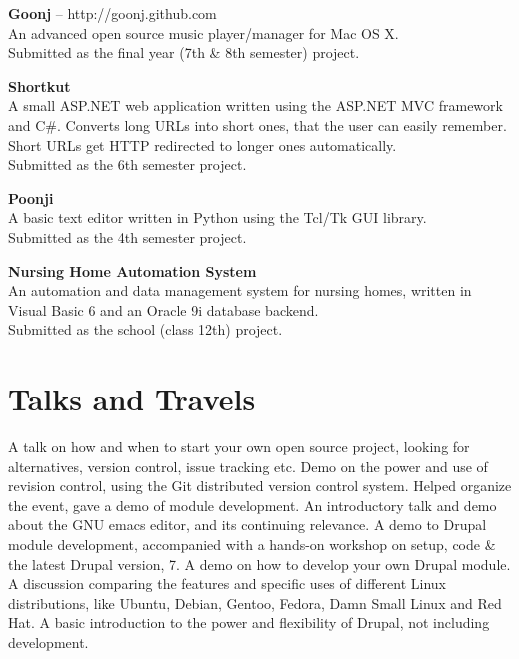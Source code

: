 \documentclass[11pt,a4paper]{moderncv}
\begin{document}
\cvlistitem
{\textbf{Goonj} -- {\small http://goonj.github.com}
  \\An advanced open source music player/manager for Mac OS X.
  \\Submitted as the final year (7th \& 8th semester) project.\\
}

\cvlistitem
{\textbf{Shortkut}
  \\A small ASP.NET web application written using the ASP.NET MVC framework and C\#. Converts long URLs into short ones, that the user can easily remember. Short URLs get HTTP redirected to longer ones automatically.
  \\Submitted as the 6th semester project.\\
}

\cvlistitem
{\textbf{Poonji}
  \\A basic text editor written in Python using the Tcl/Tk GUI library.
  \\Submitted as the 4th semester project.\\
}

\cvlistitem
{\textbf{Nursing Home Automation System}
  \\An automation and data management system for nursing homes, written in Visual Basic 6 and an Oracle 9i database backend.
  \\Submitted as the school (class 12th) project.\\
}

\pagebreak

\section{Talks and Travels}

{A talk on how and when to start your own open source project, looking for alternatives, version control, issue tracking etc.}
{Demo on the power and use of revision control, using the Git distributed version control system.}
{Helped organize the event, gave a demo of module development.}
{An introductory talk and demo about the GNU emacs editor, and its continuing relevance.}
{A demo to Drupal module development, accompanied with a hands-on workshop on setup, code \& the latest Drupal version, 7.}
{A demo on how to develop your own Drupal module.}
{A discussion comparing the features and specific uses of different Linux distributions, like Ubuntu, Debian, Gentoo, Fedora, Damn Small Linux and Red Hat.}
{A basic introduction to the power and flexibility of Drupal, not including development.\\}
\end{document}
